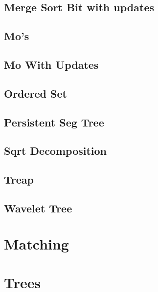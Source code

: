 \subsection{Merge Sort Bit with updates}
\raggedbottom
\hrulefill
\subsection{Mo's}
\raggedbottom
\hrulefill
\subsection{Mo With Updates}
\raggedbottom
\hrulefill
\subsection{Ordered Set}
\raggedbottom
\hrulefill
\subsection{Persistent Seg Tree}
\raggedbottom
\hrulefill
\subsection{Sqrt Decomposition}
\raggedbottom
\hrulefill
\subsection{Treap}
\raggedbottom
\hrulefill
\subsection{Wavelet Tree}
\raggedbottom
\hrulefill

\section{Matching}

\section{Trees}

